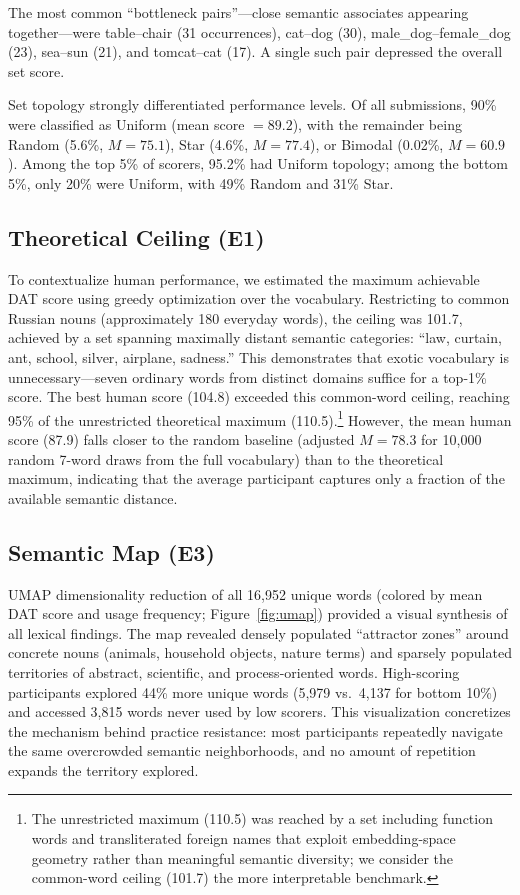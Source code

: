 \documentclass[12pt]{article}
\begin{document}
The most common ``bottleneck pairs''---close semantic associates appearing together---were table--chair (31 occurrences), cat--dog (30), male\_dog--female\_dog (23), sea--sun (21), and tomcat--cat (17). A single such pair depressed the overall set score.

Set topology strongly differentiated performance levels. Of all submissions, 90\% were classified as Uniform (mean score $= 89.2$), with the remainder being Random (5.6\%, $M = 75.1$), Star (4.6\%, $M = 77.4$), or Bimodal (0.02\%, $M = 60.9$). Among the top 5\% of scorers, 95.2\% had Uniform topology; among the bottom 5\%, only 20\% were Uniform, with 49\% Random and 31\% Star.

\subsection{Theoretical Ceiling (E1)}

To contextualize human performance, we estimated the maximum achievable DAT score using greedy optimization over the vocabulary. Restricting to common Russian nouns (approximately 180 everyday words), the ceiling was 101.7, achieved by a set spanning maximally distant semantic categories: ``law, curtain, ant, school, silver, airplane, sadness.'' This demonstrates that exotic vocabulary is unnecessary---seven ordinary words from distinct domains suffice for a top-1\% score. The best human score (104.8) exceeded this common-word ceiling, reaching 95\% of the unrestricted theoretical maximum (110.5).\footnote{The unrestricted maximum (110.5) was reached by a set including function words and transliterated foreign names that exploit embedding-space geometry rather than meaningful semantic diversity; we consider the common-word ceiling (101.7) the more interpretable benchmark.} However, the mean human score (87.9) falls closer to the random baseline (adjusted $M = 78.3$ for 10,000 random 7-word draws from the full vocabulary) than to the theoretical maximum, indicating that the average participant captures only a fraction of the available semantic distance.

\subsection{Semantic Map (E3)}

UMAP dimensionality reduction of all 16,952 unique words (colored by mean DAT score and usage frequency; Figure~\ref{fig:umap}) provided a visual synthesis of all lexical findings. The map revealed densely populated ``attractor zones'' around concrete nouns (animals, household objects, nature terms) and sparsely populated territories of abstract, scientific, and process-oriented words. High-scoring participants explored 44\% more unique words (5,979 vs.\ 4,137 for bottom 10\%) and accessed 3,815 words never used by low scorers. This visualization concretizes the mechanism behind practice resistance: most participants repeatedly navigate the same overcrowded semantic neighborhoods, and no amount of repetition expands the territory explored.
\end{document}
